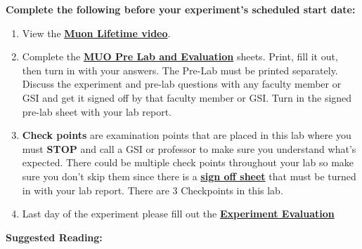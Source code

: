 \documentclass{../lab}
\begin{document}
\textbf{Complete the following before your experiment's scheduled start date:}

\begin{enumerate}
    \item View the \href{http://youtu.be/uqH0qRIwBmg}{\textbf{Muon Lifetime video}}.

    \item Complete the \href{http://experimentationlab.berkeley.edu/MUOPreLab}{\textbf{MUO Pre Lab and Evaluation}} sheets. Print, fill it out, then turn in with your answers. The Pre-Lab must be printed separately. Discuss the experiment and pre-lab questions with any faculty member or GSI and get it signed off by that faculty member or GSI. Turn in the signed pre-lab sheet with your lab report.

    \item \textbf{Check points} are examination points that are placed in this lab where you must \textbf{STOP} and call a GSI or professor to make sure you understand what's expected. There could  be multiple check points throughout your lab so make sure you don't skip them since there is a \href{http://experimentationlab.berkeley.edu/muocheckpoints}{\textbf{\textbf{sign off sheet}}} that must be turned in with your lab report. There are 3 Checkpoints in this lab.

    \item Last day of the experiment please fill out the \href{\ExperimentEvaluation}{\textbf{Experiment Evaluation}}

\end{enumerate}

\noindent\textbf{Suggested Reading:}
\end{document}
